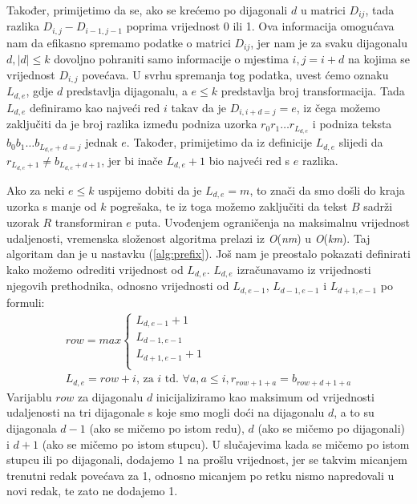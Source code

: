\documentclass[times, utf8, zavrsni]{fer}
\begin{document}
Također, primijetimo da se, ako se krećemo po dijagonali $d$ u matrici $D_{ij}$, tada razlika $D_{i,j} - D_{i-1,j-1}$ poprima vrijednost 0 ili 1. Ova informacija omogućava nam da efikasno spremamo podatke o matrici $D_{ij}$, jer nam je za svaku dijagonalu $d, |d| \leq k$ dovoljno pohraniti samo informacije o mjestima $i,j = i+d$ na kojima se vrijednost $D_{i,j}$ povećava. U svrhu spremanja tog podatka, uvest ćemo oznaku $L_{d,e}$, gdje $d$ predstavlja dijagonalu, a $e \leq k$ predstavlja broj transformacija. Tada $L_{d,e}$ definiramo kao najveći red $i$ takav da je $D_{i,i+d=j} = e$, iz čega možemo zaključiti da je broj razlika između podniza uzorka $r_{0}r_{1}{\dots}r_{L_{d,e}}$ i podniza teksta $b_{0}b_{1}{\dots}b_{L_{d,e}+d=j}$ jednak $e$. Također, primijetimo da iz definicije $L_{d,e}$ slijedi da $r_{L_{d,e}+1}\neq b_{L_{d,e}+d+1}$, jer bi inače $L_{d,e}+1$ bio najveći red s $e$ razlika.

Ako za neki $e \leq k$ uspijemo dobiti da je $L_{d,e} = m$, to znači da smo došli do kraja uzorka s manje od $k$ pogrešaka, te iz toga možemo zaključiti da tekst $B$ sadrži uzorak $R$ transformiran $e$ puta. Uvođenjem ograničenja na maksimalnu vrijednost udaljenosti, vremenska složenost algoritma prelazi iz \textit{O}(\textit{nm}) u \textit{O}(\textit{km}). Taj algoritam dan je u nastavku (\ref{alg:prefix}). Još nam je preostalo pokazati definirati kako možemo odrediti vrijednost od $L_{d,e}$. $L_{d,e}$ izračunavamo iz vrijednosti njegovih prethodnika, odnosno vrijednosti od $L_{d,e-1}$, $L_{d-1,e-1}$ i $L_{d+1,e-1}$ po formuli:
\begin{gather*}
row = max
\begin{cases}
L_{d,e-1} + 1\\
L_{d-1,e-1}\\
L_{d+1,e-1} + 1\\
\end{cases}\\
L_{d,e} = row + i \text{, za } i \text{ td. } \forall a, a\leq i, r_{row+1+a}=b_{row+d+1+a}
\end{gather*}
Varijablu $row$ za dijagonalu $d$ inicijaliziramo kao maksimum od vrijednosti udaljenosti na tri dijagonale s koje smo mogli doći na dijagonalu $d$, a to su dijagonala $d-1$ (ako se mičemo po istom redu), $d$ (ako se mičemo po dijagonali) i $d+1$ (ako se mičemo po istom stupcu). U slučajevima kada se mičemo po istom stupcu ili po dijagonali, dodajemo 1 na prošlu vrijednost, jer se takvim micanjem trenutni redak povećava za 1, odnosno micanjem po retku nismo napredovali u novi redak, te zato ne dodajemo 1. 
\end{document}
